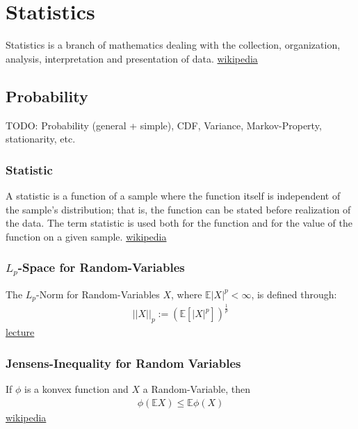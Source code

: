 
\chapter{Statistics}
Statistics is a branch of mathematics dealing with the collection, organization, analysis, interpretation and presentation of data.
\href{https://en.wikipedia.org/wiki/Statistics}{wikipedia}

\section{Probability}
TODO: Probability (general + simple), CDF, Variance, Markov-Property, stationarity, etc.


\subsection{Statistic}
A statistic is a function of a sample where the function itself is independent of the sample's distribution; that is, the function can be stated before realization of the data. The term statistic is used both for the function and for the value of the function on a given sample.
\href{https://en.wikipedia.org/wiki/Statistic}{wikipedia}


\subsection{$L_p$-Space for Random-Variables}
The $L_p$-Norm for Random-Variables $X$, where $\mathbb{E}|X|^p < \infty$, is defined through:
\begin{align*}
	||X||_p:=(\mathbb{E}[|X|^p])^{\frac{1}{p}}
\end{align*}
\href{http://www2.stat.duke.edu/courses/Fall18/sta711/lec/wk-05.pdf}{lecture}

\subsection{Jensens-Inequality for Random Variables}
If $\phi$ is a konvex function and $X$ a Random-Variable, then
\begin{align*}
	\phi(\mathbb{E}X) \leq \mathbb{E}\phi(X)
\end{align*}
\href{https://en.wikipedia.org/wiki/Jensen%27s_inequality}{wikipedia}

